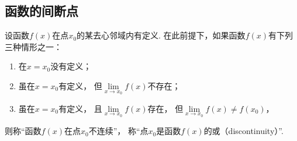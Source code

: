 %
%
%

\subsection{函数的间断点}
设函数\(f(x)\)在点\(x_0\)的某去心邻域内有定义.
在此前提下，如果函数\(f(x)\)有下列三种情形之一：
\begin{enumerate}
	\item 在\(x=x_0\)没有定义；
	\item 虽在\(x=x_0\)有定义，
	但\(\lim\limits_{x \to x_0} f(x)\)不存在；
	\item 虽在\(x=x_0\)有定义，
	且\(\lim\limits_{x \to x_0} f(x)\)存在，
	但\(\lim\limits_{x \to x_0} f(x) \neq f(x_0)\)，
\end{enumerate}
则称“函数\(f(x)\)在点\(x_0\)不连续”，
称“点\(x_0\)是函数\(f(x)\)的或（discontinuity）”.

